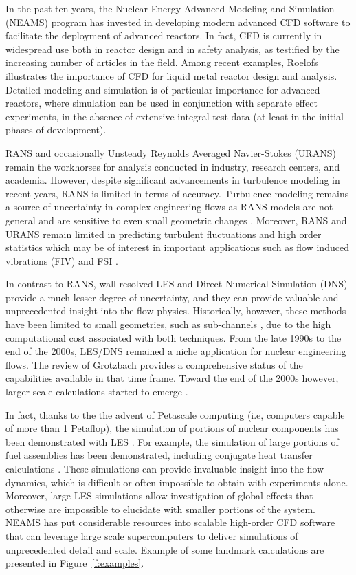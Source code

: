 In the past ten years, the Nuclear Energy Advanced Modeling and Simulation (NEAMS) program \cite{sofu2017us} has invested in developing modern advanced CFD software to facilitate the deployment of advanced reactors. In fact, CFD is currently in widespread use both in reactor design and in safety analysis, as testified by the increasing number of articles in the field. Among recent examples, Roelofs \cite{roelofs2018thermal} illustrates the importance of CFD for liquid metal reactor design and analysis. Detailed modeling and simulation is of particular importance for advanced reactors, where simulation can be used in conjunction with separate effect experiments, in the absence of extensive integral test data (at least in the initial phases of development).

RANS \cite{conner2010cfd} and occasionally Unsteady Reynolds Averaged Navier-Stokes (URANS) remain the workhorses for analysis conducted in industry, research centers, and academia.  However, despite significant advancements in turbulence modeling in recent years, RANS is limited in terms of accuracy. Turbulence modeling remains a source of uncertainty in complex engineering flows as RANS models are not general and are sensitive to even small geometric changes \cite{merzari2010numerical}. Moreover, RANS and URANS remain limited in predicting turbulent fluctuations and high order statistics which may be of interest in important applications such as flow induced vibrations (FIV) and FSI \cite{yuan2017flow}.

In contrast to RANS, wall-resolved LES and Direct Numerical Simulation (DNS) provide a much lesser degree of uncertainty, and they can provide valuable and unprecedented insight into the flow physics. Historically, however, these methods have been limited to small geometries, such as sub-channels \cite{grotzbach1999direct}, due to the high computational cost associated with both techniques. From the late 1990s to the end of the 2000s, LES/DNS remained a niche application for nuclear engineering flows. The review of Grotzbach \cite{grotzbach1999direct} provides a comprehensive status of the capabilities available in that time frame. Toward the end of the 2000s however, larger scale calculations started to emerge \cite{pointer2009simulations}.

In fact, thanks to the the advent of Petascale computing (i.e, computers capable of more than 1 Petaflop), the simulation of portions of nuclear components has been demonstrated with LES \cite{merzari2017large}. For example, the simulation of large portions of fuel assemblies has been demonstrated, including conjugate heat transfer calculations \cite{obabko2019}. These simulations can provide invaluable insight into the flow dynamics, which is difficult or often impossible to obtain with experiments alone. Moreover, large LES simulations allow investigation of global effects that otherwise are impossible to elucidate with smaller portions of the system. NEAMS has put considerable resources into scalable high-order CFD software that can leverage large scale supercomputers to deliver simulations of unprecedented detail and scale. Example of some landmark calculations are presented in Figure~\ref{f:examples}.


